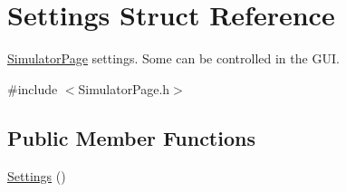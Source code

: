 \hypertarget{structSettings}{\section{Settings Struct Reference}
\label{structSettings}
}


\hyperlink{classSimulatorPage}{Simulator\-Page} settings. Some can be controlled in the G\-U\-I.  




{\ttfamily \#include $<$Simulator\-Page.\-h$>$}

\subsection*{Public Member Functions}
\begin{DoxyCompactItemize}
\item 
\hyperlink{structSettings_ab7169a6eefce79566dd07db3b1e5e967}{Settings} ()
\end{DoxyCompactItemize}
